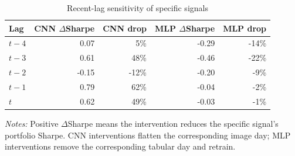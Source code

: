 \begin{table}[htbp]
\centering
\caption{Recent-lag sensitivity of specific signals}
\label{tab:recent_lag}
\begin{tabular}{lrrrr}
\toprule
Lag & CNN $\Delta$Sharpe & CNN drop & MLP $\Delta$Sharpe & MLP drop \\
\midrule
$t-4$ & 0.07 & 5\% & -0.29 & -14\% \\
$t-3$ & 0.61 & 48\% & -0.46 & -22\% \\
$t-2$ & -0.15 & -12\% & -0.20 & -9\% \\
$t-1$ & 0.79 & 62\% & -0.04 & -2\% \\
$t$ & 0.62 & 49\% & -0.03 & -1\% \\
\bottomrule
\end{tabular}
\begin{minipage}{0.92\linewidth}
\footnotesize
\textit{Notes:} Positive $\Delta$Sharpe means the intervention reduces the specific signal's portfolio Sharpe. CNN interventions flatten the corresponding image day; MLP interventions remove the corresponding tabular day and retrain.
\end{minipage}
\end{table}
